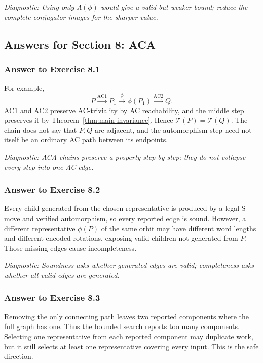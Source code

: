 \documentclass[11pt]{article}
\theoremstyle{definition}
\theoremstyle{remark}
\newcommand{\AC}{\mathrm{AC}}
\newcommand{\diagnostic}[1]{\par\smallskip\textit{Diagnostic: #1}}
\begin{document}
\diagnostic{Using only \(\Lambda(\phi)\) would give a valid but weaker
bound; reduce the complete conjugator images for the sharper value.}

\subsection*{Answers for Section 8: ACA}

\subsubsection*{Answer to Exercise 8.1}

For example,
\[
P\xrightarrow{\AC1}P_1
\xrightarrow{\phi}\phi(P_1)
\xrightarrow{\AC2}Q.
\]
AC1 and AC2 preserve AC-triviality by AC reachability, and the middle step
preserves it by Theorem~\ref{thm:main-invariance}.  Hence
\(\mathcal T(P)=\mathcal T(Q)\).  The chain does not say that \(P,Q\) are
adjacent, and the automorphism step need not itself be an ordinary AC path
between its endpoints.

\diagnostic{ACA chains preserve a property step by step; they do not
collapse every step into one AC edge.}

\subsubsection*{Answer to Exercise 8.2}

Every child generated from the chosen representative is produced by a
legal S-move and verified automorphism, so every reported edge is sound.
However, a different representative \(\phi(P)\) of the same orbit may have
different word lengths and different encoded rotations, exposing valid
children not generated from \(P\).  Those missing edges cause
incompleteness.

\diagnostic{Soundness asks whether generated edges are valid; completeness
asks whether all valid edges are generated.}

\subsubsection*{Answer to Exercise 8.3}

Removing the only connecting path leaves two reported components where the
full graph has one.  Thus the bounded search reports too many components.
Selecting one representative from each reported component may duplicate
work, but it still selects at least one representative covering every
input.  This is the safe direction.
\end{document}
